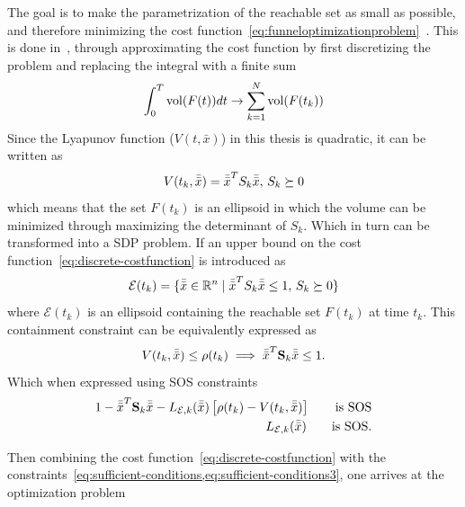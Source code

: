 The goal is to make the parametrization of the reachable set as small as
possible, and therefore minimizing the cost
function~\cref{eq:funneloptimizationproblem}~. This is done
in~\cite{majumdarFunnelLibrariesRealtime2017}, through approximating the cost
function by first discretizing the problem and replacing the integral with a
finite sum
\begin{equation}
  \int_{0}^{T} \operatorname{vol}(F(t)) dt \rightarrow \sum_{k=1}^{N} \operatorname{vol}(F(t_{k})) \label{eq:discrete-costfunction}
\end{equation}
Since the Lyapunov function (\(V(t,\bar{x})\)) in this thesis is quadratic, it
can be written as
\begin{equation}
  V(t_{k}, \bar{\bar{x}}) = {\bar{\bar{x}}}^{T}S_{k}\bar{\bar{x}}, \, S_{k} \succeq 0
\end{equation}
which means that the set \(F(t_{k})\) is an ellipsoid in which the volume can be
minimized through maximizing the determinant of \(S_{k}\). Which in turn can be
transformed into a \ac{SDP} problem. If an upper bound on the cost
function~\cref{eq:discrete-costfunction} is introduced as
\begin{equation}
  \mathcal{E} (t_{k}) = \lbrace\bar{\bar{x}} \in \mathbb{R}^n \mid {\bar{\bar{x}}}^{T}S_{k}\bar{\bar{x}} \leq 1, \, S_{k} \succeq 0\rbrace
\end{equation}
where \( \mathcal{E} ( t_{k} ) \) is an ellipsoid containing the reachable set
\( F ( t_{k} ) \) at time \( t_{k} \). This containment constraint can be
equivalently expressed as
\begin{equation}
  V ( t_{k}, \bar{\bar{x}} ) \leq \rho(t_{k})  \implies {\bar{\bar{x}}}^{T}\mathbf{S}_{k}\bar{\bar{x}} \leq 1.
\end{equation}
Which when expressed using \ac{SOS} constraints
\begin{align}
  1 - {\bar{\bar{x}}}^{T}\mathbf{S}_{k}\bar{\bar{x}} - L_{\mathcal{E},k}(\bar{\bar{x}})\left[ \rho(t_{k}) - V(t_{k}, \bar{\bar{x}}) \right]  \qquad \text{is SOS}& \\
  L_{\mathcal{E},k}(\bar{\bar{x}}) \qquad \text{is SOS.}& \\
\end{align}

Then combining the cost function~\cref{eq:discrete-costfunction} with the
constraints~\cref{eq:sufficient-conditions,eq:sufficient-conditions3}, one
arrives at the optimization problem

